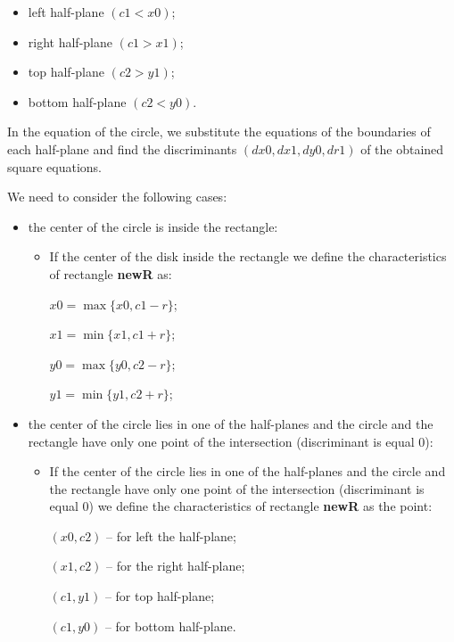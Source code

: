 \documentclass{report}
\begin{document}
	\begin{itemize}
		\item left half-plane $(c1 < x0)$;
		\item right half-plane $(c1 > x1)$;
		\item top half-plane $(c2 > y1)$;
		\item bottom half-plane $(c2 < y0)$.
	\end{itemize}
	
	In the equation of the circle, we substitute the equations of the boundaries of each half-plane and find the discriminants $(dx0, dx1, dy0, dr1)$  of the obtained square equations.
	
	
	\parindent=0pt We need to consider the following cases:
	\begin{itemize}
		\item the center of the circle is inside the rectangle:
		\begin{itemize}
			\item If the center of the disk inside the rectangle we define the characteristics of rectangle {\bfseries newR} as:
			
				\parindent=50pt
				$x0 = \max\{x0, c1-r\}$;
			
				$x1 = \min\{x1, c1+r\}$;
			
				$y0 = \max\{y0, c2-r\}$;
			
				$y1 = \min\{y1, c2+r\}$;
		\end{itemize}
		\item the center of the circle lies in one of the half-planes and the circle and the rectangle have only one point of the intersection (discriminant is equal $0$):
		
		\begin{itemize}
			\item If the center of the circle lies in one of the half-planes and the circle and the rectangle have only one point of the intersection (discriminant is equal $0$) we define the characteristics of rectangle {\bfseries newR} as the point:
			
			\parindent=50pt
			$(x0,c2)$ –  for left the half-plane;
			
			$(x1,c2)$ –  for the right half-plane;
			
			$(c1,y1)$ – for top half-plane;
			
			$(c1,y0)$ – for bottom half-plane.
			
		\end{itemize}
		

\end{itemize}
\end{document}
